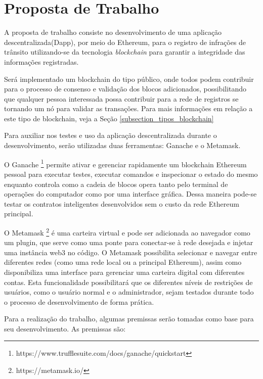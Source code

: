 \chapter[Proposta de Trabalho]{Proposta de Trabalho}

A proposta de trabalho consiste no desenvolvimento de uma aplicação descentralizada(Dapp), por meio do Ethereum, para o registro de infrações de trânsito utilizando-se da tecnologia \textit{blockchain} para garantir a integridade das informações registradas. 

Será implementado um blockchain do tipo público, onde todos podem contribuir para o processo de consenso e validação dos blocos adicionados, possibilitando que qualquer pessoa interessada possa contribuir para a rede de registros se tornando um nó para validar as transações. Para mais informações em relação a este tipo de blockchain, veja a Seção \ref{subsection_tipos_blockchain}

Para auxiliar nos testes e uso da aplicação descentralizada durante o desenvolvimento, serão utilizadas duas ferramentas: Ganache e o Metamask. 

O Ganache \footnote{https://www.trufflesuite.com/docs/ganache/quickstart} permite ativar e gerenciar rapidamente um blockchain Ethereum pessoal para executar testes, executar comandos e inspecionar o estado do mesmo enquanto controla como a cadeia de blocos opera tanto pelo terminal de operações do computador como por uma interface gráfica. Dessa maneira pode-se testar os contratos inteligentes desenvolvidos sem o custo da rede Ethereum principal. 

O Metamask \footnote{https://metamask.io/} é uma carteira virtual e pode ser adicionada ao navegador como um plugin, que serve como uma ponte para conectar-se à rede desejada e injetar uma instância web3 no código. O Metamask possibilita selecionar e navegar entre diferentes redes (como uma rede local ou a principal Ethereum), assim como disponibiliza uma interface para gerenciar uma carteira digital com diferentes contas. Esta funcionalidade possibilitará que os diferentes níveis de restrições de usuários, como o usuário normal e o administrador, sejam testados durante todo o processo de desenvolvimento de forma prática.




Para a realização do trabalho, algumas premissas serão tomadas como base para seu desenvolvimento. As premissas são:

